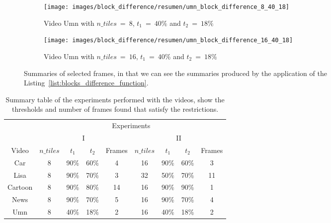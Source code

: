 \documentclass[journal]{IEEEtran}
\begin{document}
\begin{figure}
	
	\centering
	\begin{subfigure}{0.23\textwidth}
		\centering
		\texttt{[image: images/block\_difference/resumen/umn\_block\_difference\_8\_40\_18]} 
		\caption{Video Umn with $n\_tiles~=~8$, $t_1~=~40\%$ and $t_2~=~18\%$}
		\label{fig:block_difference:resumen:umn_8_40_18} 
	\end{subfigure}
	\centering
	\begin{subfigure}{0.23\textwidth}
		\centering
		\texttt{[image: images/block\_difference/resumen/umn\_block\_difference\_16\_40\_18]}
		\caption{Video Umn with $n\_tiles~=~16$, $t_1~=~40\%$ and $t_2~=~18\%$}
		\label{fig:block_difference:resumen:umn_16_40_18}
	\end{subfigure}
	
	
	\caption{Summaries of selected frames, in that we can see the summaries produced by the application of the Listing~\ref{list:blocks_difference_function}.}
	\label{fig:block_difference:resumen}
\end{figure}

\begin{table}
	\centering
	\begin{tabular}{ | c | c | c | c | c | c | c | c | c |}
		\hline
		& \multicolumn{8}{|c|}{Experiments} \\ 
		\cline{2-9}
		& \multicolumn{4}{|c|}{I} &  \multicolumn{4}{|c|}{II} \\
		\hline
		Video  & $n\_tiles$ & $t_1$ & $t_2$ & Frames & $n\_tiles$ & $t_1$ & $t_2$ & Frames  \\
		\hline
		Car & 8 & 90\% & 60\% & 4 & 16 & 90\% & 60\% & 3 \\
		Lisa & 8 & 90\% & 70\% & 3 & 32 & 50\% & 70\% & 11 \\
		Cartoon & 8 & 90\% & 80\% & 14 & 16 & 90\% & 90\% & 1 \\
		News & 8 & 90\% & 70\% & 5 & 16 & 90\% & 70\% & 4 \\
		Umn & 8 & 40\% & 18\% & 2 & 16 & 40\% & 18\% & 2 \\
		\hline
	\end{tabular}
	\caption{Summary table of the experiments performed with the videos, show the thresholds and number of frames found that satisfy the restrictions.}
	\label{tab:table:block_difference}
\end{table}
\end{document}
